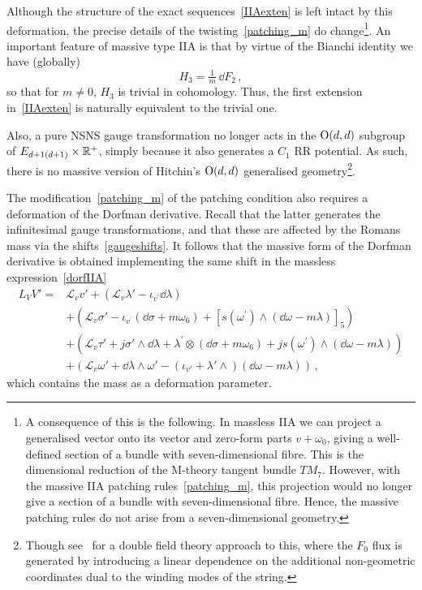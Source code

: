\documentclass[debug]{phd}
\begin{document}
						Although the structure of the exact sequences~\eqref{IIAexten} is left intact by this deformation, the precise details of the twisting~\eqref{patching_m} do change\footnote{%
							A consequence of this is the following. In massless IIA we can project a generalised vector onto its vector and zero-form parts $v+\omega_0$, giving a well-defined section of a bundle with seven-dimensional fibre. This is the dimensional reduction of the M-theory tangent bundle $TM_7$. However, with the massive IIA patching rules~\eqref{patching_m}, this projection would no longer give a section of a bundle with seven-dimensional fibre. Hence, the massive patching rules do not arise from a seven-dimensional geometry.%
							}.
 						An important feature of massive type IIA is that by virtue of the Bianchi identity we have (globally)
								\begin{equation}\label{eq:H-exact}
									H_3 = \tfrac{1}{m}\, \dd F_2 \, ,
								\end{equation}
						so that for $m\neq 0$, $H_3$ is trivial in cohomology.
						Thus, the first extension in~\eqref{IIAexten} is naturally equivalent to the trivial one.
						
						Also, a pure NSNS gauge transformation no longer acts in the $\mathrm{O}(d,d)$ subgroup of $	E_{d+1(d+1)}\times\mathbb{R}^+$, simply because it also generates a $C_1$ RR potential.
						As such, there is no massive version of Hitchin's $\mathrm{O}(d,d)$ generalised geometry\footnote{%
							Though see~\cite{Hohm:2011cp} for a double field theory approach to this, where the $F_0$ flux is generated by introducing a linear dependence on the additional non-geometric coordinates dual to the winding modes of the string.%
							}.

						The modification~\eqref{patching_m} of the patching condition also requires a deformation of the Dorfman derivative. 
						Recall that the latter generates the infinitesimal gauge transformations, and that these are affected by the Romans mass via the shifts~\eqref{gaugeshifts}. 
						It follows that the massive form of the Dorfman derivative is obtained implementing the same shift in the massless expression~\eqref{dorfIIA}
								\begin{equation}\label{dorfIIAm}
									\begin{split}
										L_V V' =& \mathcal{L}_v v' + \left(\mathcal{L}_v \lambda' - \iota_{v^\prime} \dd\lambda\right) \\
												& + \left( \mathcal{L}_v \sigma' - \iota_{v^\prime}(\dd\sigma+m\omega_6) + [s(\omega^\prime) \wedge (\dd\omega-m\lambda)]_5\right) \\
												& + \left(\mathcal{L}_v \tau' + j \sigma' \wedge \dd\lambda + \lambda^\prime \otimes (\dd\sigma+m\omega_6) + j s(\omega^\prime) \wedge (\dd\omega-m\lambda) \right) \\
												& + \left(\mathcal{L}_v \omega' + \dd \lambda \wedge \omega' - (\iota_{v'}+ \lambda' \wedge)(\dd\omega-m\lambda)\right)\, ,
									\end{split}
								\end{equation}
						which contains the mass as a deformation parameter. 
						
\end{document}

